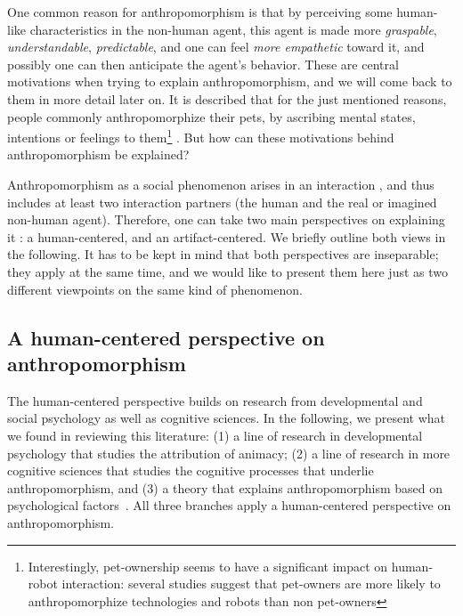 \documentclass{frontiersSCNS} %
\begin{document}
One common reason for anthropomorphism is that by perceiving some human-like characteristics in the non-human agent, this agent is made more \emph{graspable}, \emph{understandable}, \emph{predictable}, and one can feel \emph{more empathetic} toward it, and possibly one can then anticipate the agent's behavior. These are central motivations when trying to explain anthropomorphism, and we will come back to them in more detail later on. 
It is described that for the just mentioned reasons, people commonly anthropomorphize their pets, by ascribing mental states, intentions or feelings to them\footnote{Interestingly, pet-ownership seems to have a significant impact on human-robot interaction: several studies suggest that pet-owners are more likely to anthropomorphize technologies and robots than non pet-owners} \cite{eddy_attribution_1993}. But how can these motivations behind anthropomorphism be explained?

Anthropomorphism as a social phenomenon arises in an interaction \citep{persson_anthropomorphism_2000}, and thus includes at least two interaction partners (the human and the real or imagined non-human agent). Therefore, one can take two main perspectives on explaining it \citep{lee_human_2005}: a human-centered, and an artifact-centered. We briefly outline both views in the following. It has to be kept in mind that both perspectives are inseparable; they apply at the same time, and we would like to present them here just as two different viewpoints on the same kind of phenomenon.



%
%
%
%
%
%

\subsection{A human-centered perspective on anthropomorphism}

The human-centered perspective builds on research from developmental and social psychology as well as cognitive sciences.  In the following, we present what we found in reviewing this literature: (1) a line of research in developmental psychology that studies the attribution of animacy; (2) a line of research in more cognitive sciences that studies the cognitive processes that underlie anthropomorphism, and (3) a theory that explains anthropomorphism based on psychological factors~\citep{epley_seeing_2007}. All three branches apply a human-centered perspective on anthropomorphism.
\end{document}
